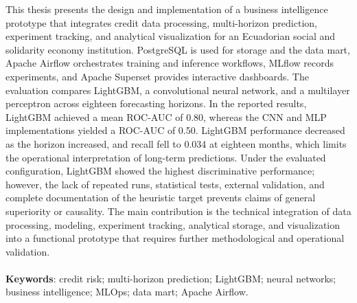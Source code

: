 This thesis presents the design and implementation of a business intelligence prototype that integrates credit data processing, multi-horizon prediction, experiment tracking, and analytical visualization for an Ecuadorian social and solidarity economy institution. PostgreSQL is used for storage and the data mart, Apache Airflow orchestrates training and inference workflows, MLflow records experiments, and Apache Superset provides interactive dashboards. The evaluation compares LightGBM, a convolutional neural network, and a multilayer perceptron across eighteen forecasting horizons. In the reported results, LightGBM achieved a mean ROC-AUC of 0.80, whereas the CNN and MLP implementations yielded a ROC-AUC of 0.50. LightGBM performance decreased as the horizon increased, and recall fell to 0.034 at eighteen months, which limits the operational interpretation of long-term predictions. Under the evaluated configuration, LightGBM showed the highest discriminative performance; however, the lack of repeated runs, statistical tests, external validation, and complete documentation of the heuristic target prevents claims of general superiority or causality. The main contribution is the technical integration of data processing, modeling, experiment tracking, analytical storage, and visualization into a functional prototype that requires further methodological and operational validation.
\\
\\
\noindent\textbf{Keywords}:
credit risk; multi-horizon prediction; LightGBM; neural networks; business intelligence; MLOps; data mart; Apache Airflow.